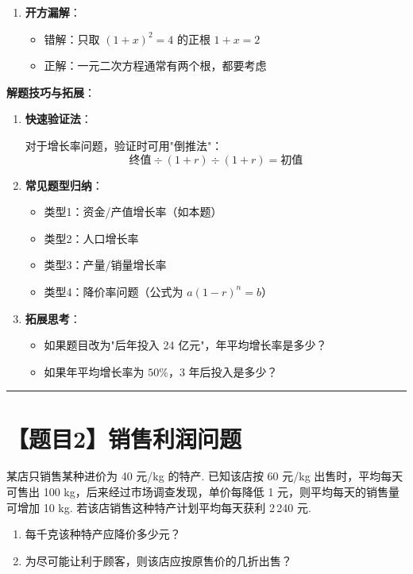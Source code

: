 \documentclass[UTF8]{ctexart}
\newenvironment{redenv}{\color{red}}{}
\newcommand{\problemrule}{\noindent\rule{\textwidth}{1.5pt}\vspace{-0.8em}}
\begin{document}
\begin{redenv}
\begin{enumerate}[label=\arabic*.]
    \item \textbf{开方漏解}：
    \begin{itemize}
        \item 错解：只取 $(1+x)^2 = 4$ 的正根 $1+x = 2$
        \item 正解：一元二次方程通常有两个根，都要考虑
    \end{itemize}
\end{enumerate}

\noindent\textbf{解题技巧与拓展}：
\begin{enumerate}[label=\arabic*.]
    \item \textbf{快速验证法}：
    
    对于增长率问题，验证时可用"倒推法"：
    \[
    \text{终值} \div (1+r) \div (1+r) = \text{初值}
    \]
    
    \item \textbf{常见题型归纳}：
    \begin{itemize}
        \item 类型1：资金/产值增长率（如本题）
        \item 类型2：人口增长率
        \item 类型3：产量/销量增长率
        \item 类型4：降价率问题（公式为 $a(1-r)^n = b$）
    \end{itemize}
    
    \item \textbf{拓展思考}：
    \begin{itemize}
        \item 如果题目改为"后年投入 24 亿元"，年平均增长率是多少？
        \item 如果年平均增长率为 $50\%$，3 年后投入是多少？
    \end{itemize}
\end{enumerate}
\end{redenv}

\newpage

\problemrule
\section*{【题目2】销售利润问题}
某店只销售某种进价为 40 元/kg 的特产. 已知该店按 60 元/kg 出售时，平均每天可售出 100 kg，后来经过市场调查发现，单价每降低 1 元，则平均每天的销售量可增加 10 kg. 若该店销售这种特产计划平均每天获利 2\,240 元.
\begin{enumerate}[label=(\arabic*)]
    \item 每千克该种特产应降价多少元？
    \item 为尽可能让利于顾客，则该店应按原售价的几折出售？
\end{enumerate}
\end{document}

